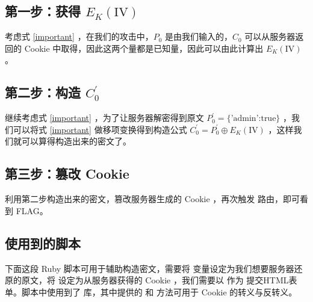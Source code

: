 \documentclass[a4paper,UTF8]{ctexart}
\begin{document}
\subsection{第一步：获得 $E_K(\mathrm{IV})$}

考虑式 \ref{important} ，在我们的攻击中，$P_0$ 是由我们输入的，$C_0$ 可以从服务器返回的 Cookie 中取得，因此这两个量都是已知量，因此可以由此计算出 $E_K(\mathrm{IV})$ 。

\subsection{第二步：构造 $C_0^\prime$}

继续考虑式 \ref{important} ，为了让服务器解密得到原文 $P_0^\prime = \text{\{'admin':true\}}$ ，我们可以将式 \ref{important} 做移项变换得到构造公式 $ C_0^\prime = P_0^\prime \oplus E_K(\mathrm{IV})$ ，这样我们就可以算得构造出来的密文了。

\subsection{第三步：篡改 Cookie}

利用第二步构造出来的密文，篡改服务器生成的 Cookie ，再次触发  路由，即可看到 FLAG。

\subsection{使用到的脚本}

下面这段 Ruby 脚本可用于辅助构造密文，需要将  变量设定为我们想要服务器还原的原文，将  设定为从服务器获得的 Cookie ，我们需要以  作为  提交HTML表单。脚本中使用到了  库，其中提供的  和  方法可用于 Cookie 的转义与反转义。
\end{document}
